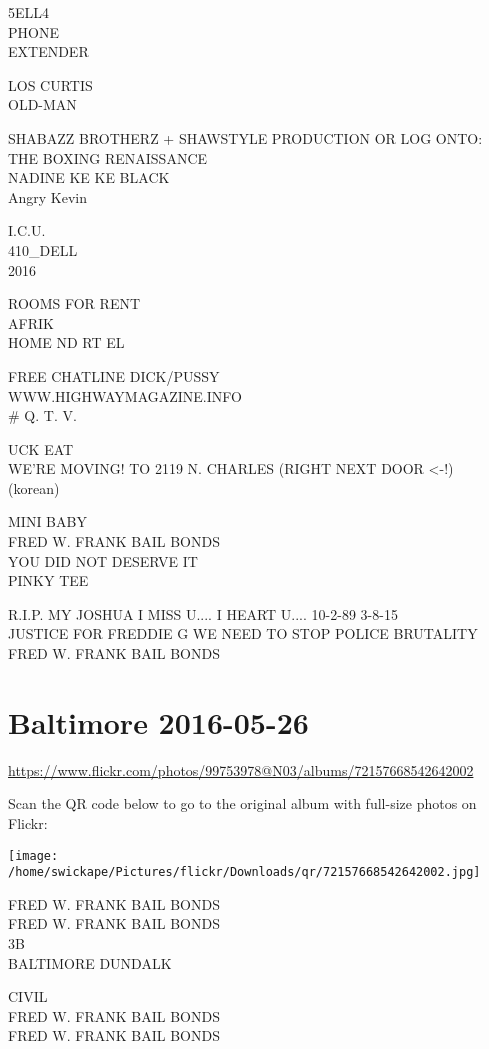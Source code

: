 \documentclass[10pt,letterpaper]{article}
\begin{document}
5ELL4\\
PHONE\\
EXTENDER

LOS CURTIS\\
OLD{-}MAN

SHABAZZ BROTHERZ + SHAWSTYLE PRODUCTION OR LOG ONTO: THE BOXING RENAISSANCE\\
NADINE KE KE BLACK\\
Angry Kevin

I.C.U.\\
410\_DELL\\
2016

ROOMS FOR RENT\\
AFRIK\\
HOME ND RT EL

FREE CHATLINE DICK/PUSSY\\
WWW.HIGHWAYMAGAZINE.INFO\\
\# Q. T. V.

UCK EAT\\
WE'RE MOVING!  TO 2119 N. CHARLES (RIGHT NEXT DOOR <{-}!)\\
(korean)

MINI BABY\\
FRED W. FRANK BAIL BONDS\\
YOU DID NOT DESERVE IT\\
PINKY TEE

R.I.P. MY JOSHUA I MISS U.... I HEART U.... 10{-}2{-}89 3{-}8{-}15\\
JUSTICE FOR FREDDIE G WE NEED TO STOP POLICE BRUTALITY\\
FRED W. FRANK BAIL BONDS


\section*{Baltimore 2016-05-26}

\url{https://www.flickr.com/photos/99753978@N03/albums/72157668542642002}

Scan the QR code below to go to the original album with full-size photos on Flickr:

\texttt{[image: /home/swickape/Pictures/flickr/Downloads/qr/72157668542642002.jpg]}


FRED W. FRANK BAIL BONDS\\
FRED W. FRANK BAIL BONDS\\
3B\\
BALTIMORE DUNDALK

CIVIL\\
FRED W. FRANK BAIL BONDS\\
FRED W. FRANK BAIL BONDS
\end{document}

